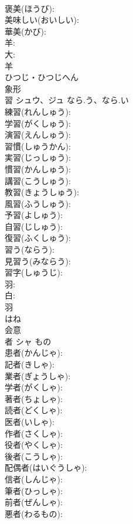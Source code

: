 \documentclass[8pt]{extreport}
\begin{document}
\begin{CJK}{UTF8}{min}
\\	褒美(ほうび): 
\\	美味しい(おいしい): 
\\	華美(かび): 
\\	羊: 
\\	大: 
\\	羊	
\\	ひつじ・ひつじへん	
\\	象形 
\\	習	シュウ、ジュ	なら.う、なら.い		
\\	練習(れんしゅう): 
\\	学習(がくしゅう): 
\\	演習(えんしゅう): 
\\	習慣(しゅうかん): 
\\	実習(じっしゅう): 
\\	慣習(かんしゅう): 
\\	講習(こうしゅう): 
\\	教習(きょうしゅう): 
\\	風習(ふうしゅう): 
\\	予習(よしゅう): 
\\	自習(じしゅう): 
\\	復習(ふくしゅう): 
\\	習う(ならう): 
\\	見習う(みならう): 
\\	習字(しゅうじ): 
\\	羽: 
\\	白: 
\\	羽	
\\	はね	
\\	会意 
\\	者	シャ	もの		
\\	患者(かんじゃ): 
\\	記者(きしゃ): 
\\	業者(ぎょうしゃ): 
\\	学者(がくしゃ): 
\\	著者(ちょしゃ): 
\\	読者(どくしゃ): 
\\	医者(いしゃ): 
\\	作者(さくしゃ): 
\\	役者(やくしゃ): 
\\	後者(こうしゃ): 
\\	配偶者(はいぐうしゃ): 
\\	信者(しんじゃ): 
\\	筆者(ひっしゃ): 
\\	前者(ぜんしゃ): 
\\	悪者(わるもの): 

\end{CJK}
\end{document}
